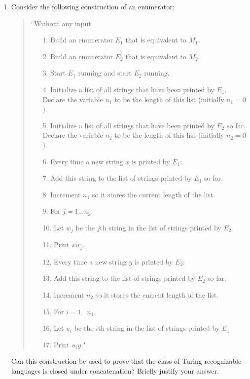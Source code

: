 \documentclass[12pt, oneside]{article}
\begin{document}
\begin{enumerate}
\begin{enumerate}
    \item Consider the  following construction of an enumerator: 
    \begin{quote}
    ``Without any input
    \begin{itemize}
    \item[1.] Build an enumerator $E_1$ that is equivalent to  $M_1$.
    \item[2.] Build an enumerator $E_2$ that is equivalent to  $M_2$.
    \item[3.] Start $E_1$ running and start $E_2$ running.
    \item[4.] Initialize a list of all strings that have been printed by $E_1$. Declare the variable $n_1$ to be the length of  this  list 
    (initially $n_1 = 0$).
    \item[5.] Initialize a list of all strings that have been printed 
    by $E_2$ so far.
    Declare the variable $n_2$ to be the length of  this  list (initially $n_2 = 0$).
    \item[6.] Every time a new string $x$ is printed by $E_1$: 
    \item[7.] \qquad Add this string to the list of strings printed by $E_1$ so far.
    \item[8.] \qquad Increment $n_1$ so it stores the current length of the list.
    \item[9.] \qquad For $j =  1 \ldots n_2$, 
    \item[10.] \qquad \qquad Let $w_j$ be the $j$th string in the list of strings printed  by  $E_2$
    \item[11.] \qquad \qquad Print $xw_j$.
    \item[12.] Every time a new string $y$ is printed by $E_2$: 
    \item[13.] \qquad Add this string to the list of strings printed by $E_2$ so far.
    \item[14.] \qquad Increment $n_2$ so it stores the current length of the list.
    \item[15.] \qquad For $i =  1 \ldots n_1$, 
    \item[16.] \qquad \qquad Let $u_i$ be the $i$th string in the list of strings printed  by  $E_1$
    \item[17.] \qquad \qquad Print $u_i y$."
    \end{itemize}
    \end{quote}
    
    Can this construction  be  used  to prove that the class  of  Turing-recognizable languages is closed under 
    concatenation? Briefly justify your  answer.
    

\end{enumerate}
\end{enumerate}
\end{document}
